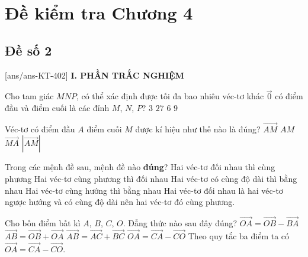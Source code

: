 \section*{Đề kiểm tra Chương 4}
\subsection*{Đề số 2}
\setcounter{ex}{0}\setcounter{bt}{0}
[ans/ans-KT-402]
\noindent\textbf{I. PHẦN TRẮC NGHIỆM}
\begin{ex}%
	Cho tam giác $MNP$, có thể xác định được tối đa bao nhiêu véc-tơ khác $\overrightarrow{0}$ có điểm đầu và điểm cuối là các đỉnh $M$, $N$, $P$?
	\choice
	{$3$}
	{$27$}
	{\True $6$}
	{$9$}
\end{ex}

\begin{ex}%
	Véc-tơ có điểm đầu $A$ điểm cuối $M$ được kí hiệu như thế nào là đúng?
	\choice
	{\True $\overrightarrow{AM}$}
	{$AM$}
	{$\overrightarrow{MA}$}
	{$\left|\overrightarrow{AM} \right|$}
\end{ex}

\begin{ex}%
	Trong các mệnh đề sau, mệnh đề nào \textbf{đúng}?
	\choice
	{\True Hai véc-tơ đối nhau thì cùng phương}
	{Hai véc-tơ cùng phương thì đối nhau}
	{Hai véc-tơ có cùng độ dài thì bằng nhau}
	{Hai véc-tơ cùng hướng thì bằng nhau}
	\loigiai
	{Hai véc-tơ đối nhau là hai véc-tơ ngược hướng và có cùng độ dài nên hai véc-tơ đó cùng phương.}
\end{ex}

\begin{ex}%
	Cho bốn điểm bất kì $A$, $B$, $C$, $O$. Đẳng thức nào sau đây đúng?
	\choice
	{$\overrightarrow{OA}= \overrightarrow{OB}-\overrightarrow{BA}$}
	{$\overrightarrow{AB}= \overrightarrow{OB}+\overrightarrow{OA}$}
	{$\overrightarrow{AB}= \overrightarrow{AC}+\overrightarrow{BC}$}
	{\True $\overrightarrow{OA}= \overrightarrow{CA}-\overrightarrow{CO}$}
	\loigiai
	{
		Theo quy tắc ba điểm ta có $\overrightarrow{OA}= \overrightarrow{CA}-\overrightarrow{CO}$.
	}
\end{ex}

